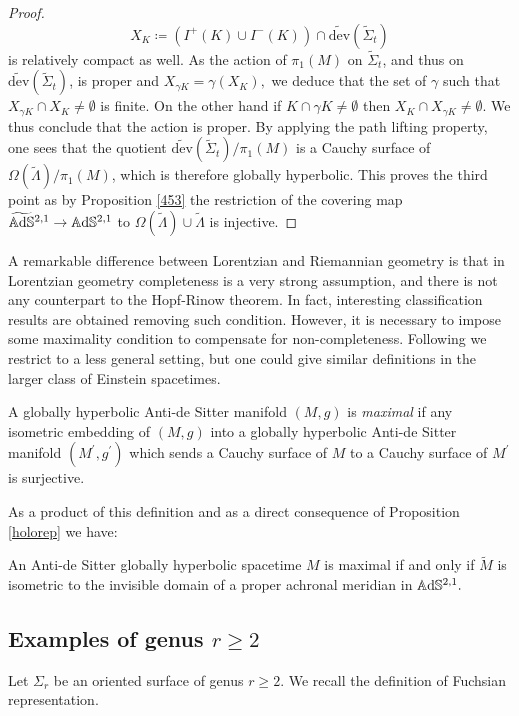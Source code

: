 \begin{proof}
    \[
        X_K\coloneqq (I^+(K)\cup I^-(K))\cap \widetilde{\text{dev}}(\widetilde{\Sigma}_t) 
    \]   
    is relatively compact as well. As the action of $\pi_1(M)$ on $\widetilde{\Sigma}_t$, and thus on $\widetilde{\text{dev}}(\widetilde{\Sigma}_t)$, is proper and $X_{\gamma K}=\gamma(X_K),$ we deduce that the set of $\gamma$ such that $X_{\gamma K}\cap X_K\neq\emptyset$ is finite. On the other hand if $K\cap \gamma K\neq\emptyset$ then $X_K\cap X_{\gamma K}\neq \emptyset.$ We thus conclude that the action is proper. By applying the path lifting property, one sees that the quotient $\widetilde{\text{dev}}(\widetilde{\Sigma}_t)/\pi_1(M)$ is a Cauchy surface of $\Omega(\widetilde{\Lambda})/\pi_1(M)$, which is therefore globally hyperbolic. This proves the third point as by Proposition \ref{453} the restriction of the covering map $\widetilde{\mathbb{A}\mathrm{d}\mathbb{S}}{}^{2,1}\to \mathbb{A}\mathrm{d}\mathbb{S}^{2,1}$ to $\Omega(\widetilde{\Lambda})\cup \widetilde{\Lambda}$ is injective. 
\end{proof}

A remarkable difference between Lorentzian and Riemannian geometry is that in Lorentzian geometry completeness is a very strong assumption, and there is not any counterpart to the Hopf-Rinow theorem. In fact, interesting classification results are obtained removing such condition. However, it is necessary to impose some maximality condition to compensate for non-completeness. Following \cite{bonsanteseppi} we restrict to a less general setting, but one could give similar definitions in the larger class of Einstein spacetimes.

\begin{definition}
    A globally hyperbolic Anti-de Sitter manifold $(M,g)$ is \textit{maximal} if any isometric embedding of $(M,g)$ into a globally hyperbolic Anti-de Sitter manifold $(M^{\prime},g^{\prime})$ which sends a Cauchy surface of $M$ to a Cauchy surface of $M^{\prime}$ is surjective.
\end{definition}

As a product of this definition and as a direct consequence of Proposition \ref{holorep} we have:

\begin{corollary}
An Anti-de Sitter globally hyperbolic spacetime $M$ is maximal if and only if $\widetilde{M}$ is isometric to the invisible domain of a proper achronal meridian in $\mathbb{A}\mathrm{d}\mathbb{S}^{2,1}.$
\end{corollary}



\subsection{Examples of genus $r\geq 2$}\label{hasteccato}
Let $\Sigma_r$ be an oriented surface of genus $r\geq 2.$ We recall the definition of Fuchsian representation. 

